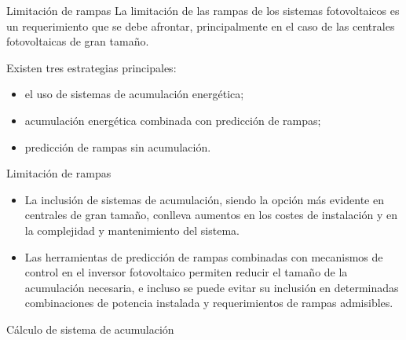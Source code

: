 \documentclass[aspectratio=169, usenames,svgnames,dvipsnames]{beamer}
\begin{document}
\begin{frame}[label={sec:org144a388}]{Limitación de rampas}
La limitación de las rampas de los sistemas fotovoltaicos es un
requerimiento que se debe afrontar, principalmente en el caso de las
centrales fotovoltaicas de gran tamaño.

Existen tres estrategias principales:
\begin{itemize}
\item el uso de sistemas de acumulación energética;
\item acumulación energética combinada con predicción de rampas;
\item predicción de rampas sin acumulación.
\end{itemize}
\end{frame}

\begin{frame}[label={sec:org8512a43}]{Limitación de rampas}
\begin{itemize}
\item La inclusión de sistemas de acumulación, siendo la opción más
evidente en centrales de gran tamaño, conlleva aumentos en los
costes de instalación y en la complejidad y mantenimiento del
sistema.

\item Las herramientas de predicción de rampas combinadas con mecanismos
de control en el inversor fotovoltaico permiten reducir el tamaño de
la acumulación necesaria, e incluso se puede evitar su inclusión en
determinadas combinaciones de potencia instalada y requerimientos de
rampas admisibles.
\end{itemize}
\end{frame}
\begin{frame}[label={sec:orgdb06d63}]{Cálculo de sistema de acumulación}
\end{frame}
\end{document}
